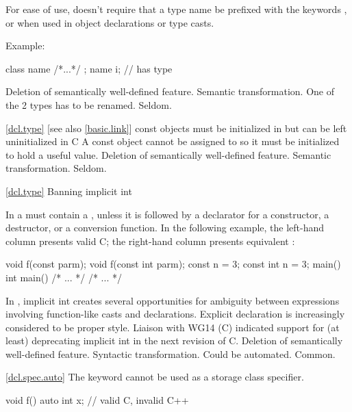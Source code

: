 \rationale
For ease of use, \Cpp doesn't require that a type name be prefixed
with the keywords ,  or  when used in object
declarations or type casts.

Example:
\begin{codeblock}
class name { /*...*/ };
name i;                         //  has type 
\end{codeblock}

\effect
Deletion of semantically well-defined feature.
\difficulty
Semantic transformation.
One of the 2 types has to be renamed.
\howwide
Seldom.

\ref{dcl.type} [see also \ref{basic.link}]
\change const objects must be initialized in \Cpp but can be left uninitialized in C
\rationale
A const object cannot be assigned to so it must be initialized
to hold a useful value.
\effect
Deletion of semantically well-defined feature.
\difficulty
Semantic transformation.
\howwide
Seldom.

\ref{dcl.type}
\change Banning implicit int

In \Cpp a
must contain a
, unless
it is followed by a declarator for a constructor, a destructor, or a
conversion function.
In the following example, the
left-hand column presents valid C;
the right-hand column presents
equivalent \Cpp :

\begin{codeblock}
void f(const parm);            void f(const int parm);
const n = 3;                   const int n = 3;
main()                         int main()
    /* ... */                      /* ... */
\end{codeblock}

\rationale
In \Cpp, implicit int creates several opportunities for
ambiguity between expressions involving function-like
casts and declarations.
Explicit declaration is increasingly considered
to be proper style.
Liaison with WG14 (C) indicated support for (at least)
deprecating implicit int in the next revision of C.
\effect
Deletion of semantically well-defined feature.
\difficulty
Syntactic transformation.
Could be automated.
\howwide
Common.

\ref{dcl.spec.auto}
\change
The keyword  cannot be used as a storage class specifier.

\begin{codeblock}
void f() {
  auto int x;     // valid C, invalid C++
}
\end{codeblock}

